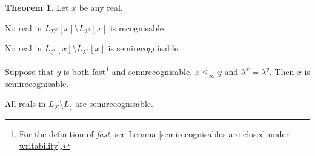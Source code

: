 \documentclass[a4paper,11pt]{amsart}
\theoremstyle{definition}
\newtheorem{theorem}[fact]{Theorem}
\newtheorem*{problem A}{Problem 1}
\newtheorem*{problem B}{Problem 2}
\theoremstyle{remark}
\newenvironment{enumerate-(1)}{\begin{enumerate}[label={\upshape (\arabic*)}, leftmargin=2pc]}{\end{enumerate}}
\begin{document}
\begin{theorem} Let $x$ be any real. %
\label{semidecidable undecidable reals} 
\begin{enumerate-(1)} 
\item 
\label{semidecidable undecidable reals - part 1} 
No real in $L_{\Sigma^{x}}[x]\setminus L_{\lambda^{x}}[x]$ is recognisable.
\item 
\label{semidecidable undecidable reals - part 2} 
No real in $L_{\zeta^{x}}[x]\setminus L_{\lambda^{x}}[x]$ is semirecognisable. 
\item 
\label{semidecidable undecidable reals - semirecognisable}
Suppose that $y$ is both fast\footnote{For the definition of \emph{fast}, see Lemma \ref{semirecognisables are closed under writability}.} and semirecognisable, $x\leq
_{\infty}y$ and %
 $\lambda^{x}=\lambda^{y}$. 
 Then $x$ is semirecognisable. 
\item 
\label{semidecidable undecidable reals - part 4} 
All reals in $L_{\Sigma}\setminus L_{\zeta}$ are semirecognisable.
\end{enumerate-(1)} 
\end{theorem}
\end{document}
